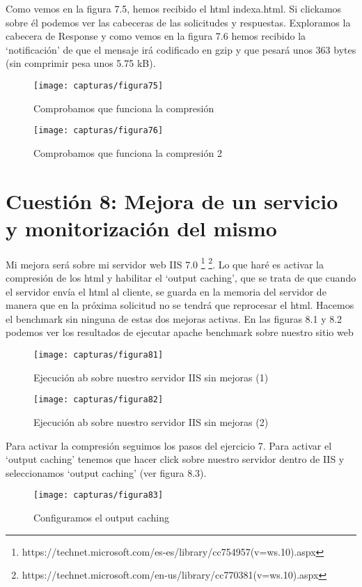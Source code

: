 Como vemos en la figura 7.5, hemos recibido el html indexa.html. Si clickamos sobre él podemos ver las cabeceras de las solicitudes y respuestas. Exploramos la cabecera de Response y como vemos en la figura 7.6 hemos recibido la ‘notificación’ de que el mensaje irá codificado en gzip y que pesará unos 363 bytes (sin comprimir pesa unos 5.75 kB).

	\begin{figure} [H]
	\centering
	\texttt{[image: capturas/figura75]}
	\caption{Comprobamos que funciona la compresión}
	\label{fig:figura75}
	\end{figure}
	
	\begin{figure} [H]
	\centering
	\texttt{[image: capturas/figura76]}
	\caption{Comprobamos que funciona la compresión 2}
	\label{fig:figura76}
	\end{figure}
	
	\section{Cuestión 8: Mejora de un servicio y monitorización del mismo}
	Mi mejora será sobre mi servidor web IIS 7.0 \footnote{https://technet.microsoft.com/es-es/library/cc754957(v=ws.10).aspx} \footnote{https://technet.microsoft.com/en-us/library/cc770381(v=ws.10).aspx}. Lo que haré es activar la compresión de los html y habilitar el ‘output caching’, que se trata de que cuando el servidor envía el html al cliente, se guarda en la memoria del servidor de manera que en la próxima solicitud no se tendrá que reprocesar el html. Hacemos el benchmark sin ninguna de estas dos mejoras activas.
	En las figuras 8.1 y 8.2 podemos ver los resultados de ejecutar apache benchmark sobre nuestro sitio web
	\begin{figure} [H]
	\centering
	\texttt{[image: capturas/figura81]}
	\caption{Ejecución ab sobre nuestro servidor IIS sin mejoras (1)}
	\label{fig:figura81}
	\end{figure}
	
	\begin{figure} [H]
	\centering
	\texttt{[image: capturas/figura82]}
	\caption{Ejecución ab sobre nuestro servidor IIS sin mejoras (2)}
	\label{fig:figura82}
	\end{figure}

	Para activar la compresión seguimos los pasos del ejercicio 7. Para activar el ‘output caching’ tenemos que hacer click sobre nuestro servidor dentro de IIS y seleccionamos ‘output caching’ (ver figura 8.3). 
	\begin{figure} [H]
	\centering
	\texttt{[image: capturas/figura83]}
	\caption{Configuramos el output caching}
	\label{fig:figura83}
	\end{figure}
	
